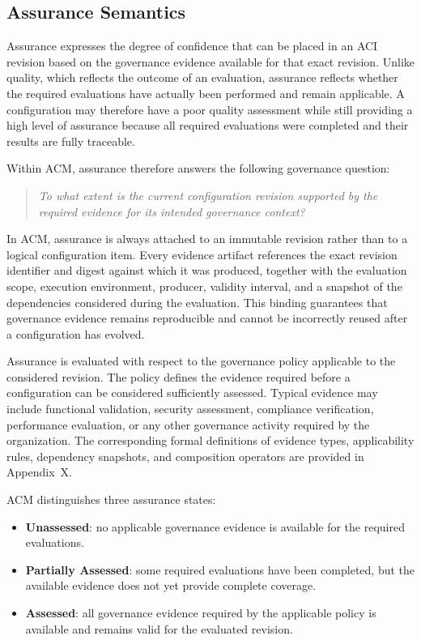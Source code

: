 \documentclass[10pt]{article}
\begin{document}
\subsection{Assurance Semantics}
\label{subsec:assurance_semantics}

Assurance expresses the degree of confidence that can be placed in an ACI revision based on the governance evidence available for that exact revision. Unlike quality, which reflects the outcome of an evaluation, assurance reflects whether the required evaluations have actually been performed and remain applicable. A configuration may therefore have a poor quality assessment while still providing a high level of assurance because all required evaluations were completed and their results are fully traceable. 

Within ACM, assurance therefore answers the following governance question:
\begin{quote}
	\emph{To what extent is the current configuration revision supported by the
		required evidence for its intended governance context?}
\end{quote}

In ACM, assurance is always attached to an immutable revision rather than to a logical configuration item. Every evidence artifact references the exact revision identifier and digest against which it was produced, together with the evaluation scope, execution environment, producer, validity interval, and a snapshot of the dependencies considered during the evaluation. This binding guarantees that governance evidence remains reproducible and cannot be incorrectly reused after a configuration has evolved.

Assurance is evaluated with respect to the governance policy applicable to the considered revision. The policy defines the evidence required before a configuration can be considered sufficiently assessed. Typical evidence may include functional validation, security assessment, compliance verification, performance evaluation, or any other governance activity required by the organization. The corresponding formal definitions of evidence types, applicability rules, dependency snapshots, and composition operators are provided in Appendix~X.

ACM distinguishes three assurance states:

\begin{itemize}
	\item \textbf{Unassessed}: no applicable governance evidence is available for the required evaluations.
	\item \textbf{Partially Assessed}: some required evaluations have been completed, but the available evidence does not yet provide complete coverage.
	\item \textbf{Assessed}: all governance evidence required by the applicable policy is available and remains valid for the evaluated revision.
\end{itemize}
\end{document}
